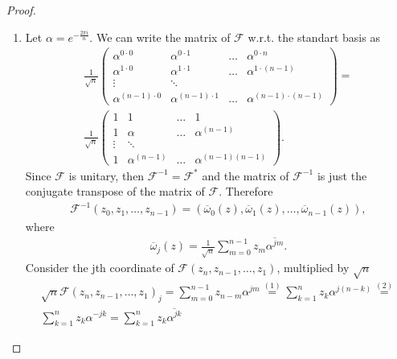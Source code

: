 \documentclass{extarticle}
\begin{document}
\begin{proof}
\begin{enumerate}[label=(\alph*)]
    \item
    Let \( \alpha = e^{-\frac{2 \pi i}{n}} \).
    We can write the matrix of \( \mathcal{F} \) w.r.t. the standart basis as
    \begin{gather*}
        \frac{1}{\sqrt{n}}
        \begin{pmatrix}
           \alpha^{0 \cdot 0} & \alpha^{0 \cdot 1}  & \ldots & \alpha^{0 \cdot n}  \\
           \alpha^{1 \cdot 0} & \alpha^{1 \cdot 1} & \ldots  & \alpha^{1 \cdot (n-1)} \\
           \vdots  & \ddots &  &  \\
           \alpha^{(n-1) \cdot 0} & \alpha^{(n-1) \cdot 1} & \ldots  & \alpha^{(n-1) \cdot (n-1)}
        \end{pmatrix}
        = \\
        \frac{1}{\sqrt{n}}
        \begin{pmatrix}
           1 & 1 & \ldots & 1  \\
           1 & \alpha & \ldots & \alpha^{(n-1)} \\
           \vdots  & \ddots &  &  \\
           1 & \alpha^{(n-1)} & \ldots  & \alpha^{(n-1) (n-1)}
        \end{pmatrix}.
    \end{gather*}
    Since \( \mathcal{F} \) is unitary, then \( \mathcal{F}^{-1} = \mathcal{F}^* \) and
    the matrix of \( \mathcal{F}^{-1} \) is just the conjugate transpose of the matrix of \( \mathcal{F} \).
    Therefore
    \begin{gather*}
        \mathcal{F}^{-1} (z_0, z_1, \ldots, z_{n-1}) =
        (\overline\omega_0(z), \overline\omega_1(z), \ldots, \overline\omega_{n-1}(z)),
    \end{gather*}
    where
    \begin{gather*}
        \overline\omega_j(z) = \frac{1}{\sqrt{n}} \sum_{m=0}^{n-1}
        {z_m \overline{\alpha^{jm}}}.
    \end{gather*}
    Consider the jth coordinate of \(\mathcal{F} (z_n, z_{n-1}, \ldots, z_{1})\),
    multiplied by \( \sqrt{n} \)
    \begin{gather*}
        {\sqrt{n}} \mathcal{F} (z_n, z_{n-1}, \ldots, z_{1})_{j} =
        \sum_{m=0}^{n-1} z_{n-m} \alpha^{jm}
        \overset{(1)}{=}
        \sum_{k=1}^{n} z_{k} \alpha^{j(n - k)}
        \overset{(2)}{=}  \\
        \sum_{k=1}^{n} z_{k} \alpha^{-jk}
        =
        \sum_{k=1}^{n} z_{k} \overline{\alpha^{jk}}

\end{gather*}
\end{enumerate}
\end{proof}
\end{document}
